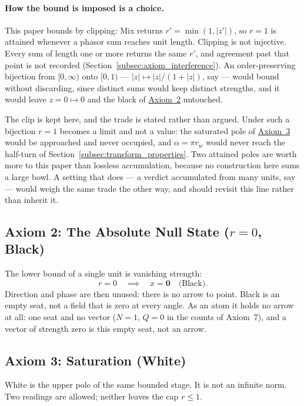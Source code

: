 \documentclass[12pt, a4paper]{article}
\begin{document}
\paragraph{How the bound is imposed is a choice.}
This paper bounds by clipping: Mix returns $r'=\min(1,|z'|)$, so
$r=1$ is attained whenever a phasor sum reaches unit length. Clipping
is not injective. Every sum of length one or more returns the same
$r'$, and agreement past that point is not recorded
(Section~\ref{subsec:axiom_interference}). An order-preserving
bijection from $[0,\infty)$ onto $[0,1)$ --- $|z|\mapsto|z|/(1+|z|)$,
say --- would bound without discarding, since distinct sums would keep
distinct strengths, and it would leave $z=0\mapsto 0$ and the black of
\hyperref[subsec:axiom_null]{Axiom~2} untouched.

The clip is kept here, and the trade is stated rather than argued.
Under such a bijection $r=1$ becomes a limit and not a value: the
saturated pole of \hyperref[subsec:axiom_white]{Axiom~3} would be approached
and never occupied, and $\alpha=\pi r_w$ would never reach the
half-turn of Section~\ref{subsec:transform_properties}. Two attained
poles are worth more to this paper than lossless accumulation, because
no construction here sums a large bowl. A setting that does --- a
verdict accumulated from many units, say --- would weigh the same
trade the other way, and should revisit this line rather than inherit
it.

\subsection{Axiom 2: The Absolute Null State ($r = 0$, Black)}
\label{subsec:axiom_null}
The lower bound of a single unit is vanishing strength:
\begin{equation}
    r = 0 \quad \implies \quad x = \mathbf{0}
    \quad \text{(Black)}.
    \label{eq:null_state}
\end{equation}
Direction and phase are then unused: there is no arrow to point.
Black is an empty seat, not a field that is zero at every angle. As an
atom it holds no arrow at all: one seat and no vector ($N=1$, $Q=0$ in
the counts of Axiom~7), and a vector of strength zero is this empty
seat, not an arrow.

\subsection{Axiom 3: Saturation (White)}
\label{subsec:axiom_white}
White is the upper pole of the same bounded stage. It is not an infinite
norm. Two readings are allowed; neither leaves the cap $r\le 1$.
\end{document}
